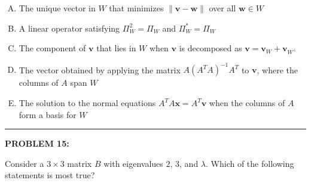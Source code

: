 \documentclass[12pt]{amsart}
\newcommand{\divider}{
  \vspace{-1em} %
  \noindent
  \raisebox{-0.15ex}{\textbullet}%
  \hspace{0.5em}%
  \rule[0.5ex]{0.95\textwidth}{1.0pt}%
  \hspace{0.5em}%
  \raisebox{-0.15ex}{\textbullet}%
  \vspace{0em} %
}
\begin{document}
\begin{enumerate}[(A)]
\item The unique vector in $W$ that minimizes $\|\mathbf{v} - \mathbf{w}\|$ over all $\mathbf{w} \in W$
\item A linear operator satisfying $\Pi_W^2 = \Pi_W$ and $\Pi_W^* = \Pi_W$
\item The component of $\mathbf{v}$ that lies in $W$ when $\mathbf{v}$ is decomposed as $\mathbf{v} = \mathbf{v}_W + \mathbf{v}_{W^\perp}$
\item The vector obtained by applying the matrix $A(A^TA)^{-1}A^T$ to $\mathbf{v}$, where the columns of $A$ span $W$
\item The solution to the normal equations $A^TA\mathbf{x} = A^T\mathbf{v}$ when the columns of $A$ form a basis for $W$
\end{enumerate}


\divider

{\bf PROBLEM 15:}

Consider a $3 \times 3$ matrix $B$ with eigenvalues $2$, $3$, and $\lambda$. Which of the following statements is most true?
\end{document}
